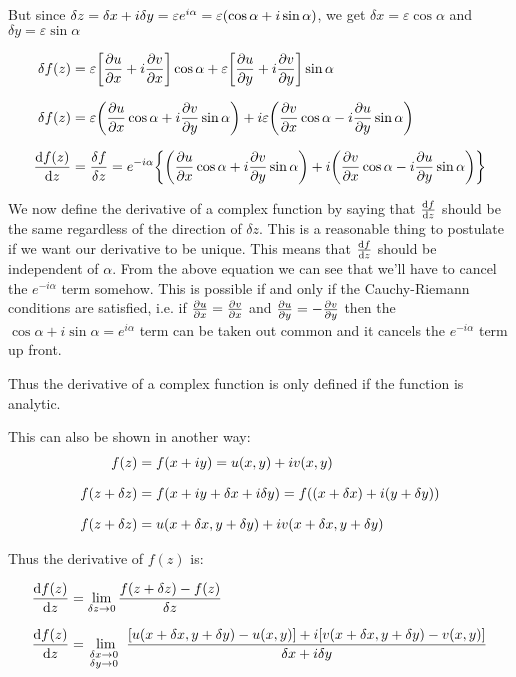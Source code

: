 \documentclass[12pt, letterpaper]{book}
\begin{document}
But since $\delta z= \delta x+ i\delta y= \varepsilon e^{i\alpha}= \varepsilon \qty(\cos\alpha+i\sin\alpha)$, we get $\delta x= \varepsilon\cos\alpha$ and $\delta y= \varepsilon\sin\alpha$

\begin{equation*}
\setlength{\jot}{10pt}
    \begin{aligned}
     \delta f(z) &= \varepsilon\qty[\pdv{u}{x}+i\pdv{v}{x}]\cos\alpha +\varepsilon\qty[\pdv{u}{y}+i\pdv{v}{y}]\sin\alpha\\
     \delta f(z) &= \varepsilon\qty(\pdv{u}{x}\cos\alpha+ i\pdv{v}{y}\sin\alpha)+ i\varepsilon\qty(\pdv{v}{x}\cos\alpha- i\pdv{u}{y}\sin\alpha)\\
     \dv{f(z)}{z} &= \frac{\delta f}{\delta z} = e^{-i\alpha}\qty{\qty(\pdv{u}{x}\cos\alpha+ i\pdv{v}{y}\sin\alpha)+ i\qty(\pdv{v}{x}\cos\alpha- i\pdv{u}{y}\sin\alpha)}
    \end{aligned} 
\end{equation*}

We now define the derivative of a complex function by saying that $\dv{f}{z}$ should be the same regardless of the direction of $\delta z$. This is a reasonable thing to postulate if we want our derivative to be unique. This means that $\dv{f}{z}$ should be independent of $\alpha$. From the above equation we can see that we'll have to cancel the $e^{-i\alpha}$ term somehow. This is possible if and only if the Cauchy-Riemann conditions are satisfied, i.e. if $\pdv{u}{x}= \pdv{v}{x}$ and $\pdv{u}{y}= -\pdv{v}{y}$ then the $\cos\alpha +i\sin\alpha= e^{i\alpha}$ term can be taken out common and it cancels the $e^{-i\alpha}$ term up front. 

Thus the derivative of a complex function is only defined if the function is analytic. 

This can also be shown in another way:     
\begin{equation*}
    \setlength{\jot}{10pt}
    \begin{aligned}
        f(z) &= f(x+iy) =u(x,y) + iv(x,y)\\
        f(z+\delta z)&= f(x+ iy+ \delta x+ i\delta y)= f((x+\delta x) + i(y+\delta y))\\
        f(z+\delta z) &= u(x+\delta x, y+\delta y) + iv(x+\delta x, y+\delta y)
    \end{aligned} 
\end{equation*}

Thus the derivative of $f(z)$ is: 

\begin{equation*}
    \setlength{\jot}{10pt}
    \begin{aligned}
        \dv{f(z)}{z} &= \lim_{\delta z \to 0} \frac{f(z+\delta z)- f(z)}{\delta z}\\
        \dv{f(z)}{z} &= \lim_{\begin{smallmatrix}\delta x\to 0 & \\ \delta y \to 0 \end{smallmatrix}}\frac{\qty[u(x+\delta x, y+\delta y)-u(x,y)] + i\qty[v(x+\delta x, y+\delta y)-v(x,y)]}{\delta x + i\delta y}\\
    \end{aligned} 
\end{equation*}
\end{document}

